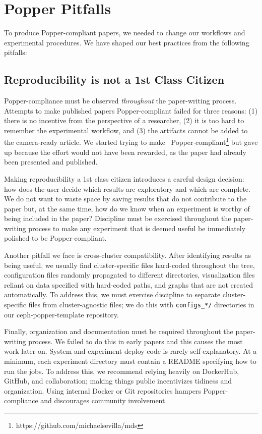 \section{Popper Pitfalls}
\label{popper-best-practices}

To produce Popper-compliant papers, we needed to change our workflows and
experimental procedures. We have shaped our best practices from the following pitfalls:

\subsection{Reproducibility is not a 1st Class Citizen}
\label{sec:repro}

Popper-compliance must be observed {\it throughout} the paper-writing process.
Attempts to make published papers Popper-compliant failed for three reasons:
(1) there is no incentive from the perspective of a researcher, (2) it is too
hard to remember the experimental workflow, and (3) the artifacts cannot be
added to the camera-ready article. We started trying to
make~\cite{sevilla:sc15-mantle}
Popper-compliant\footnote{https://github.com/michaelsevilla/mds} but gave up
because the effort would not have been rewarded, as the paper had already been
presented and published.

Making reproducibility a 1st class citizen introduces a careful design
decision: how does the user decide which results are exploratory and which are
complete. We do not want to waste space by saving results that do not
contribute to the paper but, at the same time, how do we know when an
experiment is worthy of being included in the paper? Discipline must be
exercised throughout the paper-writing process to make any experiment that is
deemed useful be immediately polished to be Popper-compliant.

Another pitfall we face is cross-cluster compatibility. After identifying
results as being useful, we usually find cluster-specific files hard-coded
throughout the tree, configuration files randomly propagated to different
directories, visualization files reliant on data specified with hard-coded
paths, and graphs that are not created automatically. To address this, we must
exercise discipline to separate cluster-specific files from cluster-agnostic
files; we do this with \texttt{configs\_*/} directories in our
ceph-popper-template repository.

Finally, organization and documentation must be required throughout the
paper-writing process. We failed to do this in early papers and this causes the
most work later on. System and experiment deploy code is rarely
self-explanatory. At a minimum, each experiment directory must contain a README
specifying how to run the jobs. To address this, we recommend relying heavily
on DockerHub, GitHub, and collaboration; making things public incentivizes 
tidiness and organization. Using internal Docker or Git repositories hampers
Popper-compliance and discourages community involvement.

